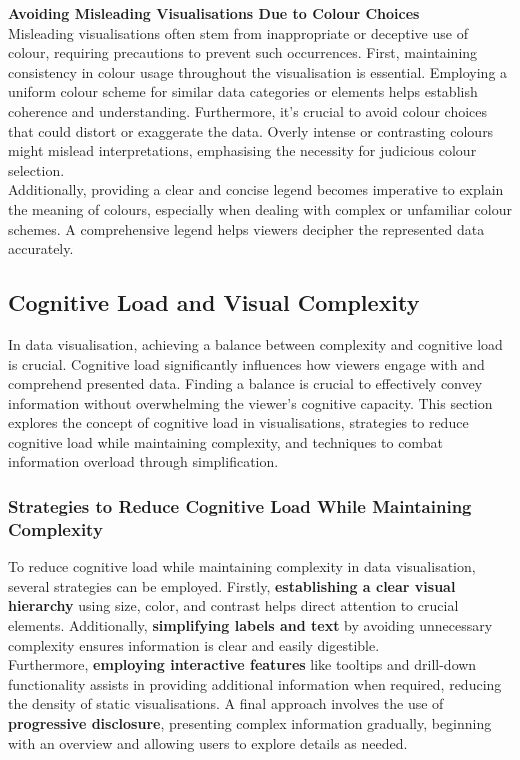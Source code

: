 \documentclass{article}\usepackage[]{graphicx}\usepackage[]{xcolor}
\begin{document}
\noindent \textbf{Avoiding Misleading Visualisations Due to Colour Choices}\\
Misleading visualisations often stem from inappropriate or deceptive use of colour, requiring precautions to prevent such occurrences. First, maintaining consistency in colour usage throughout the visualisation is essential. Employing a uniform colour scheme for similar data categories or elements helps establish coherence and understanding. Furthermore, it's crucial to avoid colour choices that could distort or exaggerate the data. Overly intense or contrasting colours might mislead interpretations, emphasising the necessity for judicious colour selection.\\

\noident 
Additionally, providing a clear and concise legend becomes imperative to explain the meaning of colours, especially when dealing with complex or unfamiliar colour schemes. A comprehensive legend helps viewers decipher the represented data accurately.\\


\subsection{Cognitive Load and Visual Complexity}
In data visualisation, achieving a balance between complexity and cognitive load is crucial. Cognitive load significantly influences how viewers engage with and comprehend presented data. Finding a balance is crucial to effectively convey information without overwhelming the viewer's cognitive capacity. This section explores the concept of cognitive load in visualisations, strategies to reduce cognitive load while maintaining complexity, and techniques to combat information overload through simplification.

\subsubsection{Strategies to Reduce Cognitive Load While Maintaining Complexity}
To reduce cognitive load while maintaining complexity in data visualisation, several strategies can be employed. Firstly, \textbf{establishing a clear visual hierarchy} using size, color, and contrast helps direct attention to crucial elements. Additionally, \textbf{simplifying labels and text} by avoiding unnecessary complexity ensures information is clear and easily digestible.\\

\noindent Furthermore, \textbf{employing interactive features} like tooltips and drill-down functionality assists in providing additional information when required, reducing the density of static visualisations. A final approach involves the use of \textbf{progressive disclosure}, presenting complex information gradually, beginning with an overview and allowing users to explore details as needed.\\
\end{document}
